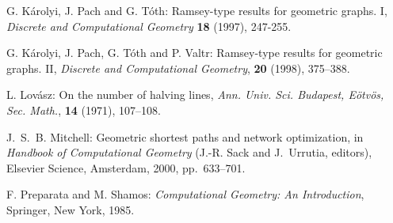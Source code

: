 \documentclass[proceedings]{stacs}
\begin{document}
\begin{thebibliography}{10}
 G. K\'arolyi, J. Pach and G. T\'oth:
{Ramsey-type results for geometric graphs. I},
{\it Discrete and Computational Geometry} {\bf 18} (1997), 247-255.

 G. K\'arolyi, J. Pach, G. T\'oth and P. Valtr:
{Ramsey-type results for geometric graphs. II},
{\it Discrete and Computational Geometry}, {\bf 20} (1998), 375--388.



 L. Lov\'asz:
On the number of halving lines,
{\it Ann. Univ. Sci. Budapest, E\"otv\"os, Sec. Math.},
{\bf 14} (1971), 107--108.

 J.~S.~B. Mitchell:
Geometric shortest paths and network optimization,
in {\em Handbook of Computational Geometry}
(J.-R. Sack and J.~Urrutia, editors),
Elsevier Science, Amsterdam, 2000, pp.~633--701.



 F. Preparata and M. Shamos:
{\em Computational Geometry: An Introduction},
Springer, New York, 1985.







\end{thebibliography}
\end{document}
